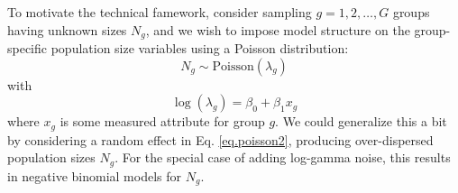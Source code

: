 To motivate the technical famework, consider sampling $g=1,2,\ldots,G$
groups having unknown sizes $N_{g}$, and we wish to impose model
structure on the group-specific population size variables using a Poisson
distribution:
\begin{equation}
 N_{g} \sim \mbox{Poisson}(\lambda_{g})
\label{eq.poisson1}
\end{equation}
with
\begin{equation}
\log( \lambda_{g} ) = \beta_{0} + \beta_{1} x_{g}
\label{eq.poisson2}
\end{equation}
where $x_{g}$ is some measured attribute for group $g$.   We
could generalize this a bit by considering a random effect in
Eq. \ref{eq.poisson2}, producing over-dispersed population
sizes $N_{g}$. For the special case of adding log-gamma noise, this
results in negative binomial models for $N_{g}$.

